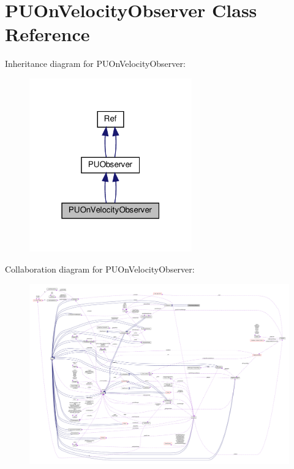 \hypertarget{classPUOnVelocityObserver}{}\section{P\+U\+On\+Velocity\+Observer Class Reference}
\label{classPUOnVelocityObserver}


Inheritance diagram for P\+U\+On\+Velocity\+Observer\+:
\nopagebreak
\begin{figure}[H]
\begin{center}
\leavevmode
\includegraphics[width=199pt]{classPUOnVelocityObserver__inherit__graph}
\end{center}
\end{figure}


Collaboration diagram for P\+U\+On\+Velocity\+Observer\+:
\nopagebreak
\begin{figure}[H]
\begin{center}
\leavevmode
\includegraphics[width=350pt]{classPUOnVelocityObserver__coll__graph}
\end{center}
\end{figure}
